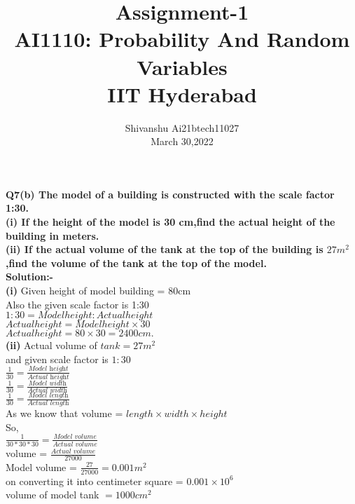 \documentclass[journal,12pt,twocolumn]{IEEEtran}
\title{\textbf{Assignment-1}\\ \large AI1110: Probability And Random Variables\\ IIT Hyderabad}
\author{Shivanshu  Ai21btech11027\\ March 30,2022}
\begin{document}
 \maketitle
 \textbf{Q7(b)\hspace{1mm} The model of a building is constructed with the scale factor 1:30.}\\

 \textbf{(i) If the height of the model is 30 cm,find the actual height of the building in meters.}\\

 \textbf{(ii) If the actual volume of the tank at the top of the building is $ 27m^2 $,find the volume of the tank at the top of the model.}\\
 
 \textbf{Solution:-}\\
 \textbf{(i)}
 Given height of model building = 80cm\\
 Also the given scale factor is 1:30\\

 \rightarrow $1 : 30 = Model height : Actual height $\\
 \rightarrow $Actual height = Model height\times 30 $\\
 \rightarrow $Actual height = 80 \times 30 = 2400 cm.$\\
 
 \textbf{(ii)}
 Actual volume of $tank = 27m^2 $\\
 and given  scale factor is $ 1:30 $\\


 $\frac{1}{30} = \frac{\textit{Model height}}{\textit{Actual height}} $\\

 $\frac{1}{30} = \frac{\textit{Model width}}{\textit{Actual width}} $\\

 $\frac{1}{30} = \frac{\textit{Model length}}{\textit{Actual length}} $\\


 As we know that volume = $length\times width\times height$\\
 So, \\
 $\frac{1}{30*30*30} = \frac{\textit{Model volume}}{\textit{Actual volume}} $\\


 volume = $\frac{\textit{Actual volume}}{27000} $\\
 
 Model volume = $\frac{27}{27000} = 0.001m^2$\\
 on converting it into centimeter square = $0.001 \times 10^6$\\
 volume of model tank $= 1000 cm^2$\\
\end{document}
